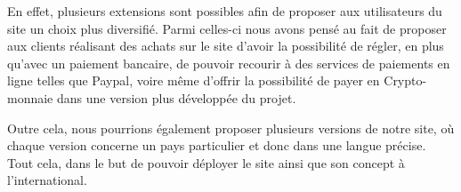 \documentclass[a4paper,12pt]{book}
\theoremstyle{break}
\theoremstyle{break}
\theoremstyle{break}
\theoremstyle{break}
\theoremstyle{definition}
\theoremstyle{remark}
\begin{document}
En effet, plusieurs extensions sont possibles afin de proposer aux utilisateurs du site un choix plus diversifié.
Parmi celles-ci nous avons pensé au fait de proposer aux clients réalisant des achats sur le site d'avoir la possibilité de régler, en plus qu'avec un paiement bancaire, de pouvoir recourir à des services de paiements en ligne telles que Paypal,
voire même d'offrir la possibilité de payer en Crypto-monnaie dans une version plus développée du projet.

Outre cela, nous pourrions également proposer plusieurs versions de notre site, où chaque version concerne un pays particulier et donc dans une langue précise.\\
Tout cela, dans le but de pouvoir déployer le site ainsi que son concept à l'international.


\end{document}
